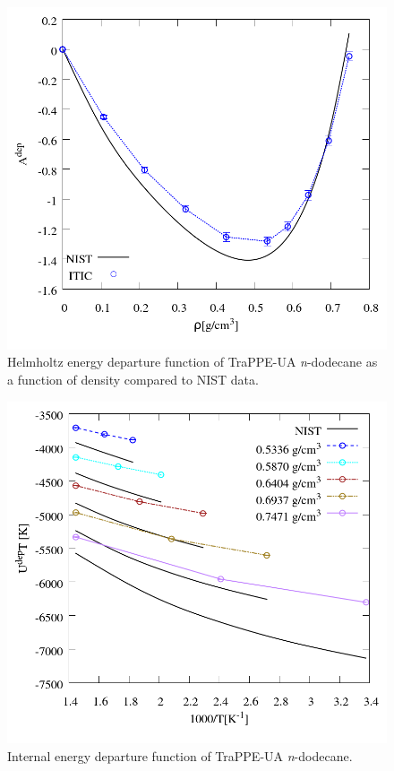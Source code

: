\documentclass[%
 aip,
 jcp,
 sd,%
 amsmath,amssymb,
]{revtex4-1}
\begin{document}
\begin{figure}[!htbp]
\includegraphics[scale=0.35]{Figures/EXAMPLE-SIM_TraPPE-C12_adep.png}
\caption{Helmholtz energy departure function of TraPPE-UA \textit{n}-dodecane as a function of density compared to NIST data.}
\label{fig:EXAMPLE-SIM/TraPPE-C12/adep}
\end{figure}

\begin{figure}[!htbp]
\includegraphics[scale=0.35]{Figures/EXAMPLE-SIM_TraPPE-C12_udep.png}
\caption{Internal energy departure function of TraPPE-UA \textit{n}-dodecane.}
\label{fig:EXAMPLE-SIM/TraPPE-C12/udep}
\end{figure}
\end{document}

